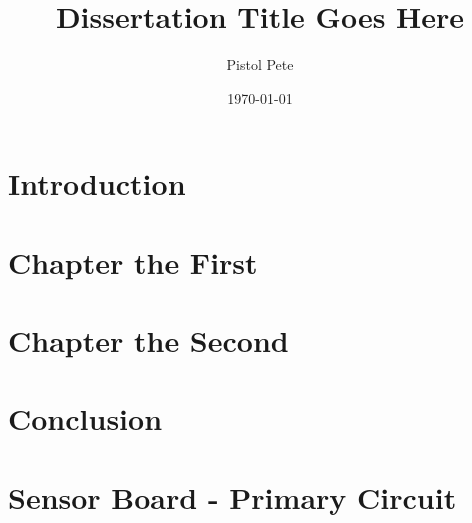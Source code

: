 \documentclass[12pt]{okstate}
\date{\today}
\title{Dissertation Title Goes Here}
\author{Pistol Pete}
\begin{document}
 
	
    

	\chapter{Introduction}
	\label{chap:1}
	
	
	\chapter{Chapter the First}
	\label{chap:2}
	
	
	\chapter{Chapter the Second}
	\label{chap:3}
	
	
	
	\chapter{Conclusion}
	\label{chap:c}
	
	
	
	
	\appendix
	\chapter{Sensor Board - Primary Circuit}
	\label{appendix:1}
	

	
	
	
	
	
	
	
	
	
\end{document}
